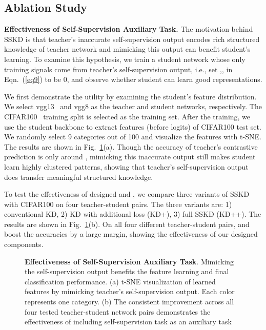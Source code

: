 \documentclass[runningheads]{llncs}
\begin{document}
\subsection{Ablation Study}
\label{sec:ablation}

\noindent
{\bf Effectiveness of Self-Supervision Auxiliary Task.}
The motivation behind SSKD is that teacher's inaccurate self-supervision output encodes rich structured knowledge of teacher network and mimicking this output can benefit student's learning. 
To examine this hypothesis, we train a student network whose only training signals come from teacher's self-supervision output, i.e., set ,,  in Eqn.~(\ref{eq9}) to be 0, and observe whether student can learn good representations. 

We first demonstrate the utility by examining the student's feature distribution.
We select vgg13~\cite{vgg} and vgg8 as the teacher and student networks, respectively. The CIFAR100~\cite{cifar100} training split is selected as the training set.
After the training, we use the student backbone to extract features (before logits) of CIFAR100 test set. We randomly select 9 categories out of 100 and visualize the features with t-SNE. The results are shown in Fig.~\ref{fig:ablation1}(a). 
Though the accuracy of teacher's contrastive prediction is only around , mimicking this inaccurate output still makes student learn highly clustered patterns, showing that teacher's self-supervision output does transfer meaningful structured knowledge.

To test the effectiveness of designed  and , we compare three variants of SSKD with CIFAR100 on four teacher-student pairs. The three variants are: 1) conventional KD, 2) KD with additional loss  (KD+), 3) full SSKD (KD++).
The results are shown in Fig.~\ref{fig:ablation1}(b). On all four different teacher-student pairs,  and  boost the accuracies by a large margin, showing the effectiveness of our designed components.

\begin{figure}[t]
\vspace{-10pt}
\caption{\textbf{Effectiveness of Self-Supervision Auxiliary Task}. Mimicking the self-supervision output benefits the feature learning and final classification performance. (a) t-SNE visualization of learned features by mimicking teacher's self-supervision output. Each color represents one category. (b) The consistent improvement across all four tested teacher-student network pairs demonstrates the effectiveness of including self-supervision task as an auxiliary task}
\label{fig:ablation1}
\vspace{-0.1cm}
\end{figure}
\end{document}
